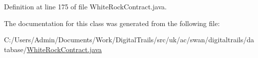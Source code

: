Definition at line 175 of file White\+Rock\+Contract.\+java.



The documentation for this class was generated from the following file\+:\begin{DoxyCompactItemize}
\item 
C\+:/\+Users/\+Admin/\+Documents/\+Work/\+Digital\+Trails/src/uk/ac/swan/digitaltrails/database/\hyperlink{_white_rock_contract_8java}{White\+Rock\+Contract.\+java}\end{DoxyCompactItemize}
